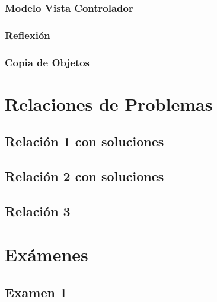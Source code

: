 \documentclass[a4paper,12pt]{article}
\begin{document}
\subsubsection{Modelo Vista Controlador}

\subsubsection{Reflexión}

\subsubsection{Copia de Objetos}



\section{Relaciones de Problemas}
\subsection{Relación 1 con soluciones}


\subsection{Relación 2 con soluciones}


\subsection{Relación 3}


\section{Exámenes}
\subsection{Examen 1}

\end{document}

